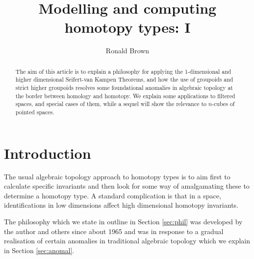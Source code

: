 \documentclass{elsarticle}
\begin{document}
\begin{frontmatter}
 \title{Modelling and computing homotopy types: I }

  \author{Ronald Brown}
  \address{School of Computer Science, Bangor University}

  \begin{abstract}
The aim of this article is to explain a philosophy for applying the 1-dimensional  and higher dimensional Seifert-van Kampen Theorems, and how the use of groupoids and strict higher groupoids resolves some foundational anomalies in  algebraic topology at the border between homology and homotopy. We   explain some applications to filtered spaces, and special cases of them, while a  sequel  will show the relevance to $n$-cubes of pointed spaces.
\end{abstract}
\begin{keyword}
\end{keyword}

\end{frontmatter}









\tableofcontents

\section*{Introduction}\label{sec:intro}
The usual algebraic topology approach to homotopy types is to aim first to calculate specific invariants and then look for some way of amalgamating these to determine a homotopy type. A standard complication is that in a space, identifications in low dimensions affect high dimensional homotopy invariants.

The philosophy which we state in outline in Section \ref{sec:phil} was developed by the author and others since about 1965 and was in response to a gradual realisation of certain anomalies in traditional algebraic topology which we explain in Section \ref{sec:anomal}.
\end{document}
